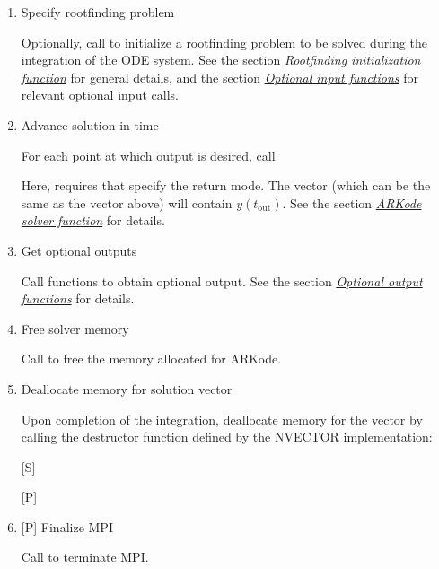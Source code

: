 \documentclass[letterpaper,10pt,english]{sphinxmanual}
\begin{document}
\begin{enumerate}
\item {} 
Specify rootfinding problem

Optionally, call {\hyperref[c_interface/User_callable:ARKodeRootInit]{}} to initialize a rootfinding
problem to be solved during the integration of the ODE system. See
the section {\hyperref[c_interface/User_callable:cinterface-rootfinding]{\emph{Rootfinding initialization function}}} for general details, and
the section {\hyperref[c_interface/User_callable:cinterface-optionalinputs]{\emph{Optional input functions}}} for relevant optional
input calls.

\item {} 
Advance solution in time

For each point at which output is desired, call


Here, {\hyperref[c_interface/User_callable:ARKode]{}} requires that 
specify the return mode. The vector  (which can be the same as
the vector  above) will contain $y(t_\text{out})$. See the section
{\hyperref[c_interface/User_callable:cinterface-integration]{\emph{ARKode solver function}}} for details.

\item {} 
Get optional outputs

Call  functions to obtain optional output. See
the section {\hyperref[c_interface/User_callable:cinterface-optionaloutputs]{\emph{Optional output functions}}} for details.

\item {} 
Free solver memory

Call  to free the memory allocated for ARKode.

\item {} 
Deallocate memory for solution vector

Upon completion of the integration, deallocate memory for the
vector  by calling the destructor function defined by the
NVECTOR implementation:

{[}S{]} 

{[}P{]} 

\item {} 
{[}P{]} Finalize MPI

Call  to terminate MPI.

\end{enumerate}
\end{document}
